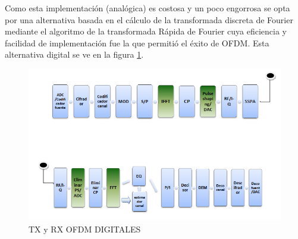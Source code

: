 \documentclass[a4paper,12pt]{report} %
\begin{document}
Como esta implementación (analógica) es costosa y un poco engorrosa se opta por una alternativa basada en el cálculo de la transformada discreta de Fourier mediante el algoritmo de la transformada Rápida de Fourier cuya eficiencia y facilidad de implementación fue la que permitió el éxito de OFDM. Esta alternativa digital se ve en la figura \ref{alt_dig}.

\begin{figure}[H]
	\centering
	\includegraphics[scale=0.9]{Imagenes/Arquitectura/alt_dig}
	\caption{TX y RX OFDM DIGITALES}
	\label{alt_dig}
\end{figure}


	

\nocite{*}
\end{document}
